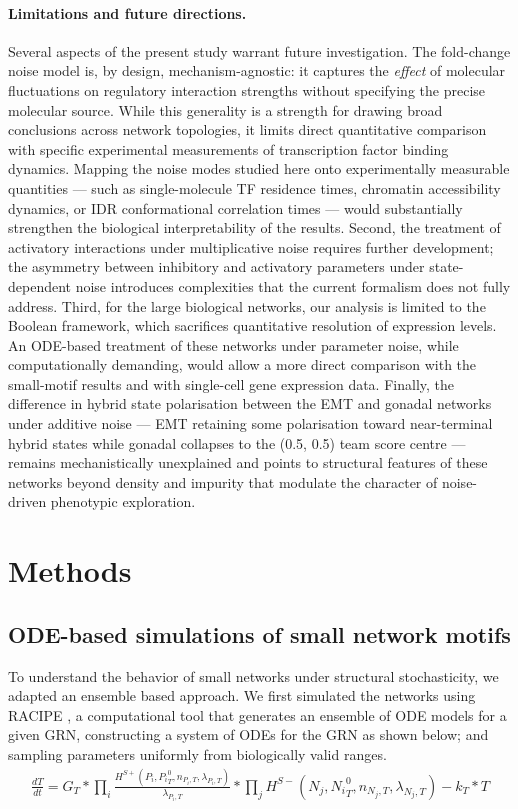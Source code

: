 \documentclass[11pt]{article}
\begin{document}
\paragraph{Limitations and future directions.}
Several aspects of the present study warrant future investigation. The fold-change noise model is, by design, mechanism-agnostic: it captures the \textit{effect} of molecular fluctuations on regulatory interaction strengths without specifying the precise molecular source. While this generality is a strength for drawing broad conclusions across network topologies, it limits direct quantitative comparison with specific experimental measurements of transcription factor binding dynamics. Mapping the noise modes studied here onto experimentally measurable quantities --- such as single-molecule TF residence times, chromatin accessibility dynamics, or IDR conformational correlation times --- would substantially strengthen the biological interpretability of the results. Second, the treatment of activatory interactions under multiplicative noise requires further development; the asymmetry between inhibitory and activatory parameters under state-dependent noise introduces complexities that the current formalism does not fully address. Third, for the large biological networks, our analysis is limited to the Boolean framework, which sacrifices quantitative resolution of expression levels. An ODE-based treatment of these networks under parameter noise, while computationally demanding, would allow a more direct comparison with the small-motif results and with single-cell gene expression data. Finally, the difference in hybrid state polarisation between the EMT and gonadal networks under additive noise — EMT retaining some polarisation toward near-terminal hybrid states while gonadal collapses to the (0.5, 0.5) team score centre — remains mechanistically unexplained and points to structural features of these networks beyond density and impurity that modulate the character of noise-driven phenotypic exploration.

\section{Methods}

\subsection{ODE-based simulations of small network motifs}\label{ODEsimsMeth}
To understand the behavior of small networks under structural stochasticity, we adapted an ensemble based approach. We first simulated the networks using RACIPE \cite{Huang2017}, a computational tool that generates an ensemble of ODE models for a given GRN, constructing a system of ODEs for the GRN as shown below; and sampling parameters uniformly from biologically valid ranges. 
\begin{equation}
    \begin{split}
        \frac{dT}{dt} =
        G_T * \prod_i \frac{H^{S+}(P_i, {P_i}^{0}_{T}, n_{P_i, T}, \lambda_{P_i, T})}{\lambda_{P_i, T}} 
        * \prod_j H^{S-}(N_j, {N_i}^{0}_{T}, n_{N_j, T}, \lambda_{N_j, T}) - k_T*T
    \end{split}
\end{equation}
\end{document}
